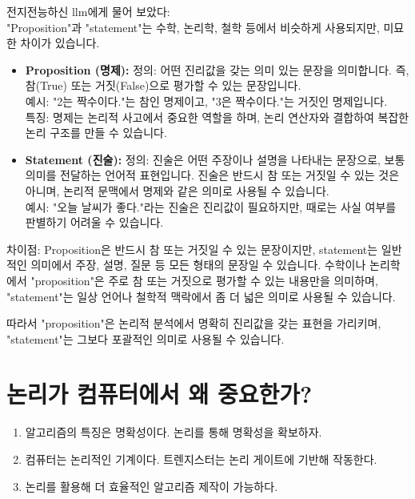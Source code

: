 \documentclass[../note.tex]{subfiles}
\begin{document}
\begin{note}
  전지전능하신 llm에게 물어 보았다:\\

  "Proposition"과 "statement"는 수학, 논리학, 철학 등에서 비슷하게 사용되지만, 미묘한 차이가 있습니다.

  \begin{itemize}
    \item
      \textbf{Proposition (명제):}
        정의: 어떤 진리값을 갖는 의미 있는 문장을 의미합니다. 즉, 참(True) 또는 거짓(False)으로 평가할 수 있는 문장입니다.\\
        예시: "2는 짝수이다."는 참인 명제이고, "3은 짝수이다."는 거짓인 명제입니다.\\
        특징: 명제는 논리적 사고에서 중요한 역할을 하며, 논리 연산자와 결합하여 복잡한 논리 구조를 만들 수 있습니다.

    \item
      \textbf{Statement (진술):}
        정의: 진술은 어떤 주장이나 설명을 나타내는 문장으로, 보통 의미를 전달하는 언어적 표현입니다. 진술은 반드시 참 또는 거짓일 수 있는 것은 아니며, 논리적 문맥에서 명제와 같은 의미로 사용될 수 있습니다.\\
        예시: "오늘 날씨가 좋다."라는 진술은 진리값이 필요하지만, 때로는 사실 여부를 판별하기 어려울 수 있습니다.
  \end{itemize}

  차이점: Proposition은 반드시 참 또는 거짓일 수 있는 문장이지만, statement는 일반적인 의미에서 주장, 설명, 질문 등 모든 형태의 문장일 수 있습니다.
  수학이나 논리학에서 "proposition"은 주로 참 또는 거짓으로 평가할 수 있는 내용만을 의미하며, "statement"는 일상 언어나 철학적 맥락에서 좀 더 넓은 의미로 사용될 수 있습니다.

  따라서 "proposition"은 논리적 분석에서 명확히 진리값을 갖는 표현을 가리키며, "statement"는 그보다 포괄적인 의미로 사용될 수 있습니다.
\end{note}

\section{논리가 컴퓨터에서 왜 중요한가?}
\begin{enumerate}
  \item
    알고리즘의 특징은 명확성이다. 논리를 통해 명확성을 확보하자.
  \item
    컴퓨터는 논리적인 기계이다. 트렌지스터는 논리 게이트에 기반해 작동한다.
  \item
    논리를 활용해 더 효율적인 알고리즘 제작이 가능하다.
\end{enumerate}
\end{document}
